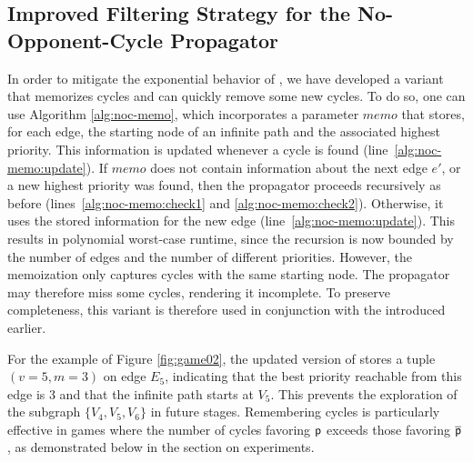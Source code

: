 \documentclass[runningheads]{llncs}
\begin{document}
\subsection{Improved Filtering Strategy for the No-Opponent-Cycle Propagator}

In order to mitigate the exponential behavior of \noceager, we have developed a variant that memorizes cycles and can quickly remove some new cycles. To do so, one can use Algorithm \ref{alg:noc-memo}, which incorporates a parameter $\textit{memo}$ that stores, for each edge, the starting node of an infinite path and the associated highest priority. This information is updated whenever a cycle is found (line~\ref{alg:noc-memo:update}). If $\textit{memo}$ does not contain information about the next edge $e'$, or a new highest priority was found, then the propagator proceeds recursively as before (lines~\ref{alg:noc-memo:check1} and \ref{alg:noc-memo:check2}). Otherwise, it uses the stored information for the new edge (line~\ref{alg:noc-memo:update}). 
This results in polynomial worst-case runtime, since the recursion is now bounded by the number of edges and the number of different priorities. However, the memoization only captures cycles with the same starting node. The propagator may therefore miss some cycles, rendering it incomplete. To preserve completeness, this variant is therefore used in conjunction with the \nocchecker introduced earlier.

For the example of Figure \ref{fig:game02}, the updated version of \noc stores a tuple $(v=5, m=3)$ on edge $E_5$, indicating that the best priority reachable from this edge is 3 and that the infinite path starts at $V_5$. This prevents the exploration of the subgraph $\{V_4, V_5, V_6\}$ in future stages.
%
Remembering cycles is particularly effective in games where the number of cycles favoring $\mathsf{p}$ exceeds those favoring $\overline{\mathsf{p}}$, as demonstrated below in the section on experiments.
\end{document}
